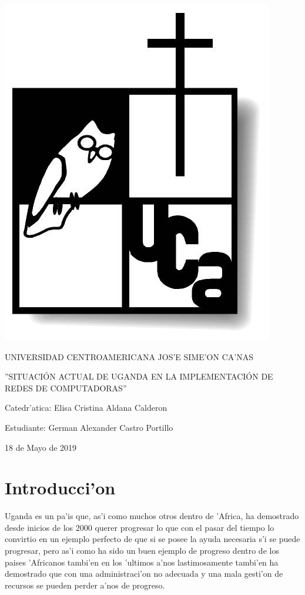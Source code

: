 \documentclass{article}
\begin{document}
	
	\begin{titlepage}
		\centering
		\includegraphics{logo}\par\vspace{0.2cm}
		{\scshape\Large UNIVERSIDAD CENTROAMERICANA JOS'E SIME'ON CA'NAS \par}
		\vspace{3cm}
		{\scshape\LARGE ''SITUACI\'ON ACTUAL DE UGANDA EN LA IMPLEMENTACI\'ON DE REDES DE COMPUTADORAS'' \par}
		\vspace{3cm}
		{\Large Catedr'atica: Elisa Cristina Aldana Calderon \par}
		\vspace{1cm}
		{\Large Estudiante: German Alexander Castro Portillo  \par}
		\vfill
		{\large 18 de Mayo de 2019 \par}
	\end{titlepage}
	
	\section*{Introducci'on}
		\large{
			Uganda es un pa'is que, as'i como muchos otros dentro de 'Africa, ha demostrado desde inicios de los 2000 querer progresar lo que con el pasar del tiempo lo convirtio en un ejemplo perfecto de que si se posee la ayuda necesaria s'i se puede progresar, pero as'i como ha sido un buen ejemplo de progreso dentro de los paises 'Africanos tambi'en en los 'ultimos a'nos lastimosamente tambi'en ha demostrado que con una administraci'on no adecuada y una mala gesti'on de recursos se pueden perder a'nos de progreso.  
		}
	
\end{document}
